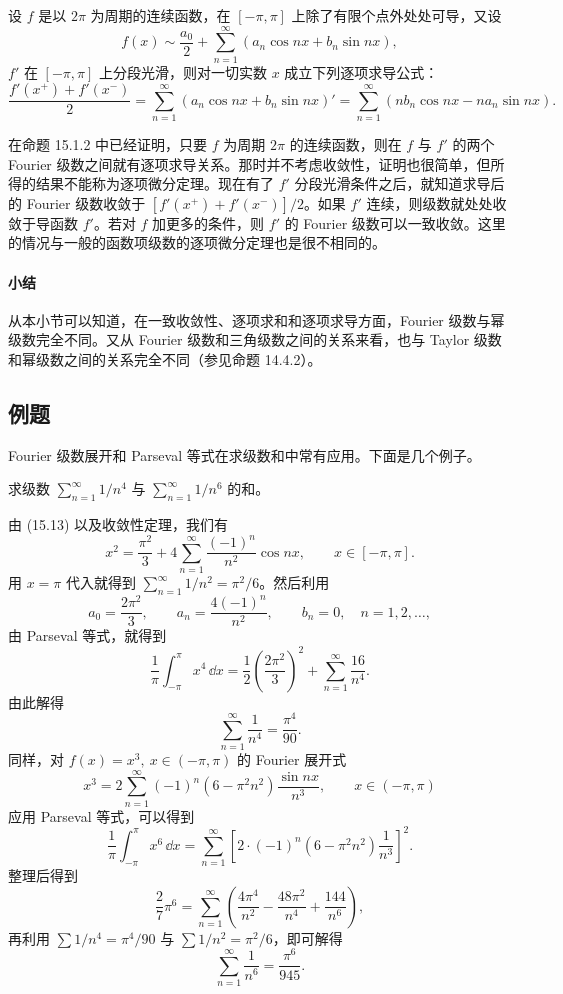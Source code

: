 \begin{xproposition}
设 $f$ 是以 $2\pi$ 为周期的连续函数，在 $[-\pi,\pi]$ 上除了有限个点外处处可导，又设
\[
  f(x)\sim\frac{a_0}{2}+\sum_{n=1}^{\infty}(a_n\cos nx+b_n\sin nx),
\]
$f'$ 在 $[-\pi,\pi]$ 上分段光滑，则对一切实数 $x$ 成立下列逐项求导公式：
\[
  \frac{f'(x^+)+f'(x^-)}2
  =\sum_{n=1}^{\infty}(a_n\cos nx+b_n\sin nx)'
  =\sum_{n=1}^{\infty}(nb_n\cos nx-na_n\sin nx).
\]
\end{xproposition}

\begin{xremark}
在命题 15.1.2 中已经证明，只要 $f$ 为周期 $2\pi$ 的连续函数，则在 $f$ 与 $f'$ 的两个 Fourier 级数之间就有逐项求导关系。那时并不考虑收敛性，证明也很简单，但所得的结果不能称为逐项微分定理。现在有了 $f'$ 分段光滑条件之后，就知道求导后的 Fourier 级数收敛于 $[f'(x^+)+f'(x^-)]/2$。如果 $f'$ 连续，则级数就处处收敛于导函数 $f'$。若对 $f$ 加更多的条件，则 $f'$ 的 Fourier 级数可以一致收敛。这里的情况与一般的函数项级数的逐项微分定理也是很不相同的。
\end{xremark}

\paragraph{小结}
从本小节可以知道，在一致收敛性、逐项求和和逐项求导方面，Fourier 级数与幂级数完全不同。又从 Fourier 级数和三角级数之间的关系来看，也与 Taylor 级数和幂级数之间的关系完全不同（参见命题 14.4.2）。

\subsection{例题}

Fourier 级数展开和 Parseval 等式在求级数和中常有应用。下面是几个例子。

\begin{xexample}[15.2.2]
求级数 $\sum_{n=1}^{\infty}1/n^4$ 与 $\sum_{n=1}^{\infty}1/n^6$ 的和。
\end{xexample}
\begin{xsolution}
由 (15.13) 以及收敛性定理，我们有
\[
  x^2=\frac{\pi^2}{3}+4\sum_{n=1}^{\infty}\frac{(-1)^n}{n^2}\cos nx,\qquad x\in[-\pi,\pi].
\]
用 $x=\pi$ 代入就得到 $\sum_{n=1}^{\infty}1/n^2=\pi^2/6$。然后利用
\[
  a_0=\frac{2\pi^2}{3},\qquad a_n=\frac{4(-1)^n}{n^2},\qquad b_n=0,\quad n=1,2,\ldots,
\]
由 Parseval 等式，就得到
\[
  \frac1\pi\int_{-\pi}^{\pi}x^4\,\dd x
  =\frac12\left(\frac{2\pi^2}{3}\right)^2+\sum_{n=1}^{\infty}\frac{16}{n^4}.
\]
由此解得
\[
  \sum_{n=1}^{\infty}\frac1{n^4}=\frac{\pi^4}{90}.
\]
同样，对 $f(x)=x^3,\ x\in(-\pi,\pi)$ 的 Fourier 展开式
\[
  x^3=2\sum_{n=1}^{\infty}(-1)^n(6-\pi^2n^2)\frac{\sin nx}{n^3},\qquad x\in(-\pi,\pi)
\]
应用 Parseval 等式，可以得到
\[
  \frac1\pi\int_{-\pi}^{\pi}x^6\,\dd x
  =\sum_{n=1}^{\infty}\left[2\cdot(-1)^n(6-\pi^2n^2)\frac1{n^3}\right]^2.
\]
整理后得到
\[
  \frac27\pi^6=\sum_{n=1}^{\infty}\left(\frac{4\pi^4}{n^2}-\frac{48\pi^2}{n^4}+\frac{144}{n^6}\right),
\]
再利用 $\sum1/n^4=\pi^4/90$ 与 $\sum1/n^2=\pi^2/6$，即可解得
\[
  \sum_{n=1}^{\infty}\frac1{n^6}=\frac{\pi^6}{945}.
\]
\end{xsolution}

